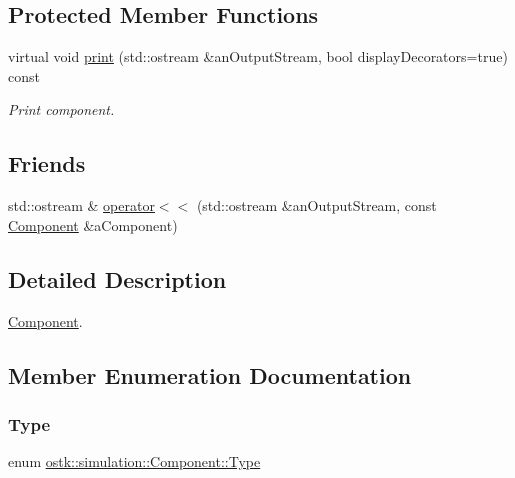 \subsection*{Protected Member Functions}
\begin{DoxyCompactItemize}
\item 
virtual void \hyperlink{classostk_1_1simulation_1_1_component_a9c102937dd6ca5fb9e3b726cc0fd5ed6}{print} (std\+::ostream \&an\+Output\+Stream, bool display\+Decorators=true) const
\begin{DoxyCompactList}\small\item\em Print component. \end{DoxyCompactList}\end{DoxyCompactItemize}
\subsection*{Friends}
\begin{DoxyCompactItemize}
\item 
std\+::ostream \& \hyperlink{classostk_1_1simulation_1_1_component_ae3c657f10ed74f15e3356a2ff54647f3}{operator$<$$<$} (std\+::ostream \&an\+Output\+Stream, const \hyperlink{classostk_1_1simulation_1_1_component}{Component} \&a\+Component)
\end{DoxyCompactItemize}


\subsection{Detailed Description}
\hyperlink{classostk_1_1simulation_1_1_component}{Component}. 

\subsection{Member Enumeration Documentation}
\mbox{\label{classostk_1_1simulation_1_1_component_a1d2ded63a8ab0bd81e27f25921be1e20}} 
\subsubsection{\texorpdfstring{Type}{Type}}
{\footnotesize\ttfamily enum \hyperlink{classostk_1_1simulation_1_1_component_a1d2ded63a8ab0bd81e27f25921be1e20}{ostk\+::simulation\+::\+Component\+::\+Type}\hspace{0.3cm}{\ttfamily [strong]}}

